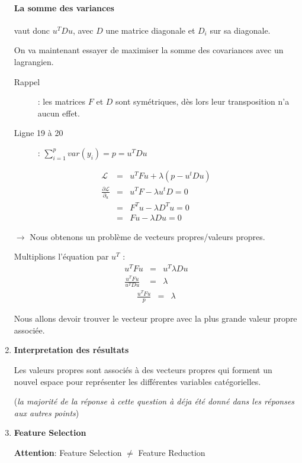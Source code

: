 \documentclass[a4paper, 11pt, onecolumn]{article}
\begin{document}
\begin{enumerate}
\paragraph{La somme des variances} vaut donc $u^TDu$, avec $D$ une matrice diagonale et $D_i$ sur sa diagonale. 

\begin{framed}
On va maintenant essayer de maximiser la somme des covariances avec un lagrangien. 
\begin{description}
  \item[Rappel] : les matrices $F$ et $D$ sont symétriques, dès lors leur transposition n'a aucun effet.
  \item[Ligne 19 à 20] : $\sum_{i=1}^pvar(y_i)=p=u^TDu$
\end{description}
\begin{eqnarray}
\mathcal{L} &=& u^TFu + \lambda(p-u^tDu)\\
\frac{\partial \mathcal L}{\partial_u} &=&  u^TF - \lambda u^tD = 0\\
&=&  F^Tu - \lambda D^Tu = 0\\
&=&  Fu - \lambda Du = 0
\end{eqnarray}

$\rightarrow$ Nous obtenons un problème de vecteurs propres/valeurs propres. 

Multiplions l'équation par $u^T$ :
\begin{eqnarray}
u^TFu &=& u^T\lambda Du\\
\frac{u^TFu}{u^TDu} &=& \lambda
\end{eqnarray}
\begin{eqnarray}
\frac{u^TFu}{p} &=& \lambda
\end{eqnarray}
\end{framed}
Nous allons devoir trouver le vecteur propre avec la plus grande valeur propre associée. 

\item \textbf{Interpretation des résultats}

Les valeurs propres sont associés à des vecteurs propres qui forment un nouvel espace pour représenter les différentes variables catégorielles. 

(\textit{la majorité de la réponse à cette question à déja été donné dans les réponses aux autres points})

\item \textbf{Feature Selection}

\textbf{Attention}: Feature Selection $\neq$ Feature Reduction


\end{enumerate}
\end{document}

